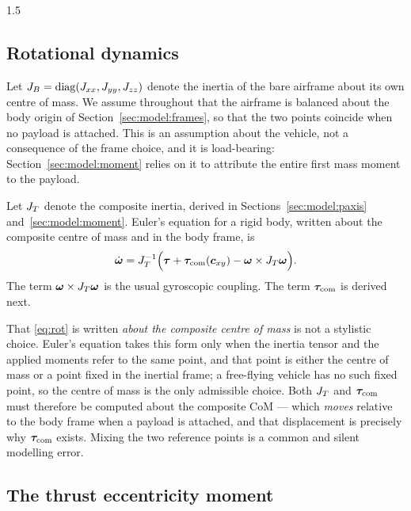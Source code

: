 \begin{spacing}{1.5}
\subsection{Rotational dynamics}\label{sec:model:rot}

Let $J_B = \mathrm{diag}(J_{xx}, J_{yy}, J_{zz})$ denote the inertia of the bare
airframe about its own centre of mass. We assume throughout that the airframe is
balanced about the body origin of Section~\ref{sec:model:frames}, so that the two
points coincide when no payload is attached. This is an assumption about the
vehicle, not a consequence of the frame choice, and it is load-bearing:
Section~\ref{sec:model:moment} relies on it to attribute the entire first mass
moment to the payload.

Let $J_T$ denote the composite inertia, derived in Sections~\ref{sec:model:paxis}
and~\ref{sec:model:moment}. Euler's equation for a rigid body, written about the
composite centre of mass and in the body frame, is
\begin{equation}
\dot{\bm{\omega}} = J_T^{-1}\Bigl( \bm{\tau} + \bm{\tau}_{\mathrm{com}}(\bm{c}_{xy}) - \bm{\omega} \times J_T \bm{\omega} \Bigr).
\label{eq:rot}
\end{equation}
The term $\bm{\omega} \times J_T \bm{\omega}$ is the usual gyroscopic coupling.
The term $\bm{\tau}_{\mathrm{com}}$ is derived next.

That \eqref{eq:rot} is written \emph{about the composite centre of mass} is not a
stylistic choice. Euler's equation takes this form only when the inertia tensor
and the applied moments refer to the same point, and that point is either the
centre of mass or a point fixed in the inertial frame; a free-flying vehicle has
no such fixed point, so the centre of mass is the only admissible choice. Both
$J_T$ and $\bm{\tau}_{\mathrm{com}}$ must therefore be computed about the composite CoM --- which
\emph{moves} relative to the body frame when a payload is attached, and that
displacement is precisely why $\bm{\tau}_{\mathrm{com}}$ exists. Mixing the two reference points is
a common and silent modelling error.

\subsection{The thrust eccentricity moment}\label{sec:model:tcom}


\end{spacing}
